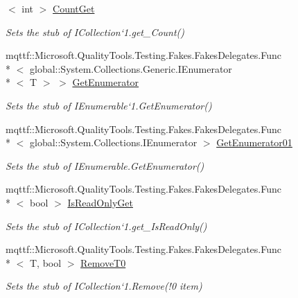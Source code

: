 \begin{DoxyCompactItemize}
$<$ int $>$ \hyperlink{class_system_1_1_collections_1_1_generic_1_1_fakes_1_1_stub_i_collection_3_01_t_01_4_abc2b3b13dff408f82c12926cc4d0f34f}{Count\-Get}
\begin{DoxyCompactList}\small\item\em Sets the stub of I\-Collection`1.get\-\_\-\-Count()\end{DoxyCompactList}\item 
mqttf\-::\-Microsoft.\-Quality\-Tools.\-Testing.\-Fakes.\-Fakes\-Delegates.\-Func\\*
$<$ global\-::\-System.\-Collections.\-Generic.\-I\-Enumerator\\*
$<$ T $>$ $>$ \hyperlink{class_system_1_1_collections_1_1_generic_1_1_fakes_1_1_stub_i_collection_3_01_t_01_4_a58735be7f0b7c79986fb1496d4a53ac2}{Get\-Enumerator}
\begin{DoxyCompactList}\small\item\em Sets the stub of I\-Enumerable`1.Get\-Enumerator()\end{DoxyCompactList}\item 
mqttf\-::\-Microsoft.\-Quality\-Tools.\-Testing.\-Fakes.\-Fakes\-Delegates.\-Func\\*
$<$ global\-::\-System.\-Collections.\-I\-Enumerator $>$ \hyperlink{class_system_1_1_collections_1_1_generic_1_1_fakes_1_1_stub_i_collection_3_01_t_01_4_a008e99e3fc28589451ae5d7c52a2a405}{Get\-Enumerator01}
\begin{DoxyCompactList}\small\item\em Sets the stub of I\-Enumerable.\-Get\-Enumerator()\end{DoxyCompactList}\item 
mqttf\-::\-Microsoft.\-Quality\-Tools.\-Testing.\-Fakes.\-Fakes\-Delegates.\-Func\\*
$<$ bool $>$ \hyperlink{class_system_1_1_collections_1_1_generic_1_1_fakes_1_1_stub_i_collection_3_01_t_01_4_a6bd2a769fef62b268e7c73f216c8f246}{Is\-Read\-Only\-Get}
\begin{DoxyCompactList}\small\item\em Sets the stub of I\-Collection`1.get\-\_\-\-Is\-Read\-Only()\end{DoxyCompactList}\item 
mqttf\-::\-Microsoft.\-Quality\-Tools.\-Testing.\-Fakes.\-Fakes\-Delegates.\-Func\\*
$<$ T, bool $>$ \hyperlink{class_system_1_1_collections_1_1_generic_1_1_fakes_1_1_stub_i_collection_3_01_t_01_4_a8ce0ead9b83e04876509bb7cb1cbd265}{Remove\-T0}
\begin{DoxyCompactList}\small\item\em Sets the stub of I\-Collection`1.Remove(!0 item)\end{DoxyCompactList}\end{DoxyCompactItemize}


